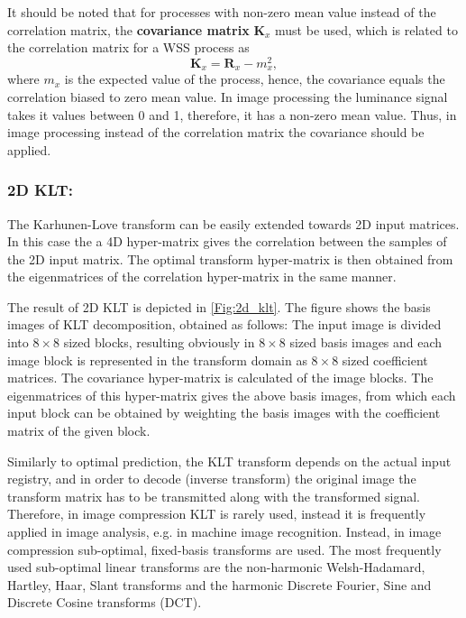It should be noted that for processes with non-zero mean value instead of the correlation matrix, the \textbf{covariance matrix} $\mathbf{K}_x$ must be used, which is related to the correlation matrix for a WSS process as
\begin{equation}
\mathbf{K}_x = \mathbf{R}_x - m_x^2,
\end{equation}
where $m_x$ is the expected value of the process, hence, the covariance equals the correlation biased to zero mean value.
In image processing the luminance signal takes it values between 0 and 1, therefore, it has a non-zero mean value.
Thus, in image processing instead of the correlation matrix the covariance should be applied.

\vspace{3mm}
\subsubsection{2D KLT:}
The Karhunen-Love transform can be easily extended towards 2D input matrices.
In this case the a 4D hyper-matrix gives the correlation between the samples of the 2D input matrix.
The optimal transform hyper-matrix is then obtained from the eigenmatrices of the correlation hyper-matrix in the same manner.

The result of 2D KLT is depicted in \ref{Fig:2d_klt}.
The figure shows the basis images of KLT decomposition, obtained as follows:
The input image is divided into $8\times8$ sized blocks, resulting obviously in $8\times8$ sized basis images and each image block is represented in the transform domain as $8\times8$ sized coefficient matrices.
The covariance hyper-matrix is calculated of the image blocks.
The eigenmatrices of this hyper-matrix gives the above basis images, from which each input block can be obtained by weighting the basis images with the coefficient matrix of the given block.

\vspace{3mm}
Similarly to optimal prediction, the KLT transform depends on the actual input registry, and in order to decode (inverse transform) the original image the transform matrix has to be transmitted along with the transformed signal.
Therefore, in image compression KLT is rarely used, instead it is frequently applied in image analysis, e.g. in machine image recognition.
Instead, in image compression sub-optimal, fixed-basis transforms are used.
The most frequently used sub-optimal linear transforms are the non-harmonic Welsh-Hadamard, Hartley, Haar, Slant transforms and the harmonic Discrete Fourier, Sine and Discrete Cosine transforms (DCT).



